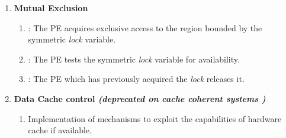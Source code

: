 \begin{enumerate}
\item \textbf{Mutual Exclusion}
\begin{enumerate}
\item {}: The \ac{PE} acquires exclusive access to the region bounded by the symmetric \textit{lock} variable.
\item {}: The \ac{PE} tests the symmetric \textit{lock} variable for availability.
\item {}: The \ac{PE} which has previously acquired the \textit{lock} releases it.
\end{enumerate}

\item \textbf{Data Cache control \textit{(deprecated on cache coherent systems )}}
\begin{enumerate}
\item Implementation of mechanisms to exploit the capabilities of hardware
cache if available.
\end{enumerate}
\end{enumerate}

